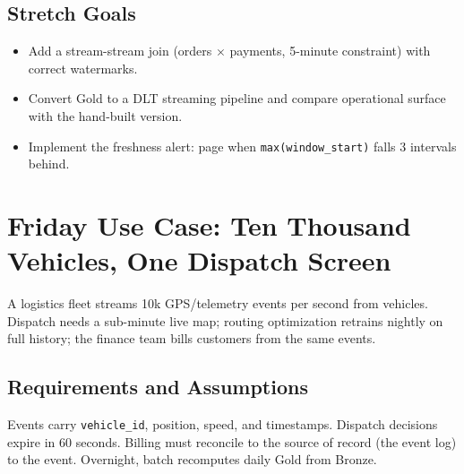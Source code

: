 \subsection*{Stretch Goals}
\begin{itemize}
    \item Add a stream-stream join (orders $\times$ payments, 5-minute constraint) with correct watermarks.
    \item Convert Gold to a DLT streaming pipeline and compare operational surface with the hand-built version.
    \item Implement the freshness alert: page when \texttt{max(window\_start)} falls 3 intervals behind.
\end{itemize}

\section{Friday Use Case: Ten Thousand Vehicles, One Dispatch Screen}
A logistics fleet streams 10k GPS/telemetry events per second from vehicles. Dispatch needs a sub-minute live map; routing optimization retrains nightly on full history; the finance team bills customers from the same events.

\subsection{Requirements and Assumptions}
Events carry \texttt{vehicle\_id}, position, speed, and timestamps. Dispatch decisions expire in 60 seconds. Billing must reconcile to the source of record (the event log) to the event. Overnight, batch recomputes daily Gold from Bronze.

